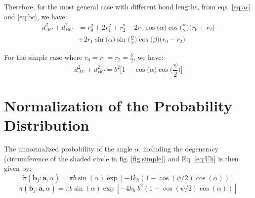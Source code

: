         Therefore, for the most general case with different bond lengths, from eqs. \eqref{eq:ac} and \eqref{eq:bc}, we have:
        \begin{equation}
            \begin{aligned}
                d_{AC}^2 + d_{BC}^2 &= r_0^2 + 2  r_1^2 + r_2^2 - 2  r_1  \cos \big( \alpha \big)  \cos \Big(\displaystyle\frac{\psi}{2}\Big)  \big( r_0 + r_2 \big)\\
                &+ 2  r_1  \sin \big( \alpha \big)  \sin \Big(\displaystyle\frac{\psi}{2}\Big)  \cos \big( \beta \big)  \big( r_0 - r_2 \big)
            \end{aligned}
        \end{equation}

        For the simple case where $r_0 = r_1 = r_2 = \displaystyle\frac{b}{2}$, we have:
        \begin{equation}
        \label{eq:final}
            d_{AC}^2 + d_{BC}^2 = b^2  \Big[ 1 - \cos \big( \alpha \big)  \cos \Big(\displaystyle\frac{\psi}{2}\Big) \Big]
        \end{equation}
    \section{Normalization of the Probability Distribution}
    \label{Appendix C}
    The unnormalized probability of the angle $\alpha$, including the degeneracy (circumference of the shaded circle in fig. \ref{fig:simple}) and Eq. \eqref{eq:Uh} is then given by:
    \ifkhExplicitP
        \begin{equation}
            \label{eq:piTildeAlpha}
            \tilde \pi({\mathbf b}_j: {\mathbf a}, \alpha)  = \pi b \sin(\alpha) \exp[-4k_h(1 - \cos(\psi/2) \cos(\alpha))]
        \end{equation}
    \else
        \begin{equation}
        \label{eq:piTildeAlpha}
            \tilde \pi({\mathbf b}_j: {\mathbf a}, \alpha)  = \pi b \sin(\alpha) \exp[-4k_h~b^2 (1 - \cos(\psi/2) \cos(\alpha))]
        \end{equation}
    \fi

